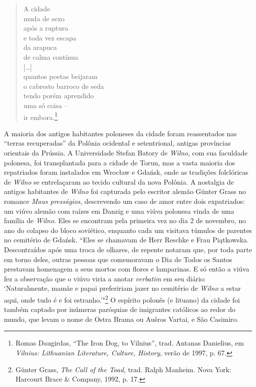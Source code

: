 \begin{verse}
A cidade\\
muda de sexo\\
após a ruptura\\
e toda vez escapa\\
da arapuca\\
de calma contínua\\
\smallskip
{[}\ldots{}{]}\\
\smallskip
quantos poetas beijaram\\
o cabresto barroco de seda\\
tendo porém aprendido\\
uma só coisa --\\
ir embora.\footnote{Romas Daugirdas, ``The Iron Dog, to Vilnius'', trad. Antanas Danielius, em \textit{Vilnius: Lithuanian Literature, Culture, History}, verão de 1997, p. 67.} 
\end{verse}

A maioria dos antigos habitantes poloneses da cidade foram reassentados
nas ``terras recuperadas'' da Polônia ocidental e setentrional, antigas
províncias orientais da Prússia. A Universidade Stefan Batory de \textit{Wilno},
com sua faculdade polonesa, foi transplantada para a cidade de Torun,
mas a vasta maioria dos repatriados foram instalados em Wrocław e
Gdańsk, onde as tradições folclóricas de \textit{Wilno} se entrelaçaram ao tecido
cultural da nova Polônia. A nostalgia de antigos habitantes de \textit{Wilno} foi
capturada pelo escritor alemão Günter Grass no romance \textit{Maus
presságios}, descrevendo um caso de amor entre dois expatriados: um
viúvo alemão com raízes em Danzig e uma viúva polonesa vinda de uma
família de \textit{Wilno}. Eles se encontram pela primeira vez no dia 2 de
novembro, no ano do colapso do bloco soviético, enquanto cada um
visitava túmulos de parentes no cemitério de Gdańsk. ``Eles se chamavam
de Herr Reschke e Frau Piątkowska. Descontraídos após uma troca de
olhares, de repente notaram que, por toda parte em torno deles, outras
pessoas que comemoravam o Dia de Todos os Santos prestavam homenagem a
seus mortos com flores e lamparinas. E só então a viúva fez a observação
que o viúvo viria a anotar \textit{verbatim} em seu diário: `Naturalmente,
mamãe e papai prefeririam jazer no cemitério de \textit{Wilno} a estar aqui, onde
tudo é e foi estranho.'"\footnote{Günter Grass, \textit{The Call of the Toad}, trad. Ralph Manheim. Nova York: Harcourt Brace \& Company, 1992, p. 17.} O espírito polonês (e lituano) da cidade foi também captado por inúmeras paróquias de imigrantes católicos ao redor do mundo, que
levam o nome de Ostra Brama ou Aušros Vartai, e São Casimiro.

